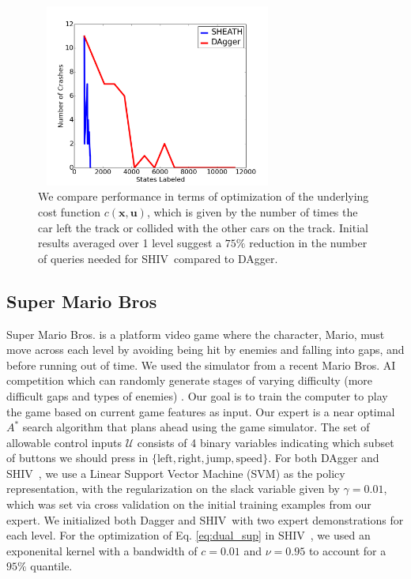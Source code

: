 \documentclass[10pt, conference]{ieeeconf}      %
\newcommand{\bu}{\mathbf{u}}
\newcommand{\bx}{\mathbf{x}}
\newcommand{\acro}{SHIV}
\begin{document}
\begin{figure}[t!]
\centering
\includegraphics[width=8cm, height=6cm]{figures/dagger_sheath_no_cars.png}
\caption{ We compare performance in terms of optimization of the underlying cost function $c(\bx,\bu)$, which is given
    by the number of times the car left the track or collided with the other cars on the track. Initial results averaged
    over 1 level suggest a $75\%$ reduction in the number of queries needed for \acro~compared to DAgger.}

\vspace*{-10pt}
\label{fig:car_cost}
\end{figure}


\subsection{Super Mario Bros}
Super Mario Bros. is a platform video game where the character, Mario, must move across each level by avoiding being hit by enemies and falling into gaps, and before running out of time. We used the simulator from a recent Mario Bros. AI competition which can randomly generate stages of varying difficulty (more difficult gaps and types of enemies) \cite{marioAI}. Our goal is to train the computer to play the game based on current game features as input. Our expert is a near optimal $A^*$ search algorithm that plans ahead using the game simulator. 
The set of allowable control inputs $\mathcal{U}$ consists of 4 binary variables indicating which subset of buttons we
should press in $\lbrace \mbox{left},\mbox{right},\mbox{jump},\mbox{speed} \rbrace$. For both DAgger and \acro~, we use
a Linear Support Vector Machine (SVM) as the policy representation, with the regularization on the slack variable given
by $\gamma=0.01$, which was set via cross validation on the initial training examples from our expert. We initialized
both Dagger and \acro~with two expert demonstrations for each level. For the optimization of Eq. \ref{eq:dual_sup} in
\acro~, we used an exponenital kernel with a bandwidth of $c=0.01$ and $\nu = 0.95$ to account for a $95\%$ quantile.
\end{document}
